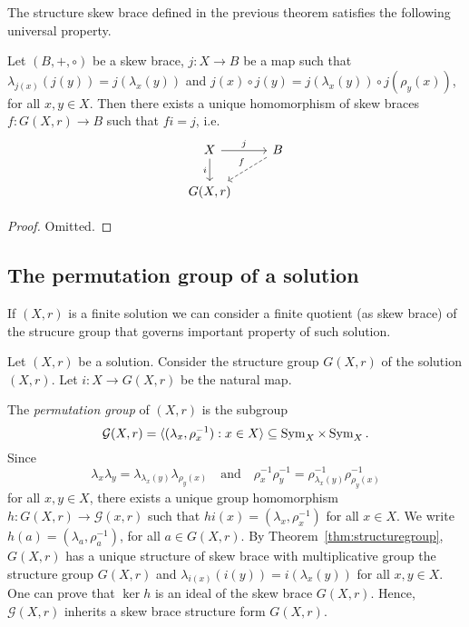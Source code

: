     The structure skew brace defined in the previous theorem satisfies the following universal property.
    
    \begin{proposition}
        Let $(B,+,\circ)$ be a skew brace, $j\colon X\rightarrow B$ be a map such that $\lambda_{j(x)}(j(y))=j(\lambda_x(y))$ and $j(x)\circ j(y)=j(\lambda_x(y))\circ j(\rho_y(x))$, for all $x,y\in X$. Then there exists a unique homomorphism of skew braces $f\colon G(X,r)\rightarrow B$ such that $fi=j$, i.e.
        \begin{equation*}
        \begin{tikzcd}
            X \arrow[r,"j"] \arrow[d,swap,"i"] &
            B \arrow[dl,swap, dashed,"f"] 
            \\
            G(X,r) 
        \end{tikzcd}
        \end{equation*}
    \end{proposition}

    \begin{proof}
        Omitted.
    \end{proof}

    \subsection{The permutation group of a solution}

    If $(X,r)$ is a finite solution we can consider a finite quotient (as skew brace) of the strucure group that governs important property of such solution. 

    Let $(X,r)$ be a solution. Consider the structure group $G(X,r)$ of the solution $(X,r)$. Let $i\colon X\to G(X,r)$ be the natural map. 

    The \emph{permutation group} of $(X,r)$ is the subgroup
\[\mathcal{G}(X,r)=\langle (\lambda_x,\rho^{-1}_x) : x\in X\rangle\subseteq\operatorname{Sym}_X\times\operatorname{Sym}_X.\]
Since 
\[ \lambda_x\lambda_y=\lambda_{\lambda_x(y)}\lambda_{\rho_y(x)}\quad\text{and}\quad \rho^{-1}_x\rho^{-1}_y=\rho^{-1}_{\lambda_x(y)}\rho^{-1}_{\rho_y(x)} \]
for all $x,y\in X$, there exists a unique group homomorphism
$h\colon G(X,r)\to \mathcal{G}(x,r)$ such that $hi(x)=(\lambda_x,\rho^{-1}_x)$ for all $x\in X$. We write $h(a)=(\lambda_a,\rho_a^{-1})$,
for all $a\in G(X,r)$.
By Theorem~\ref{thm:structuregroup}, $G(X,r)$ has a unique structure of skew brace with multiplicative group the structure group $G(X,r)$ and $\lambda_{i(x)}(i(y))=i(\lambda_x(y))$ for all $x,y\in X$. One can prove that $\ker h$ is an ideal of the skew brace $G(X,r)$. Hence, $\mathcal{G}(X,r)$ inherits a skew brace structure form $G(X,r)$.

